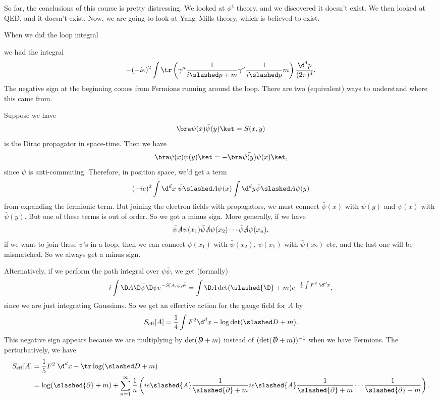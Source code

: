 \documentclass[a4paper]{article}
\begin{document}
So far, the conclusions of this course is pretty distressing. We looked at $\phi^4$ theory, and we discovered it doesn't exist. We then looked at QED, and it doesn't exist. Now, we are going to look at Yang--Mills theory, which is believed to exist.

\separator
When we did the loop integral
\begin{center}
\end{center}
we had the integral
\[
  -(-ie)^2 \int \tr \left(\gamma^\mu \frac{1}{i\slashed p + m} \gamma^\nu \frac{1}{i\slashed p}m\right)\frac{\d^4 p}{(2\pi)^d}.
\]
The negative sign at the beginning comes from Fermions running around the loop. There are two (equivalent) ways to understand where this came from.

Suppose we have
\[
  \bra\psi(x) \bar\psi(y)\ket = S(x, y)
\]
is the Dirac propagator in space-time. Then we have
\[
  \bra \psi(x) \bar{\psi}(y)\ket = - \bra \bar{\psi(y)}\psi(x)\ket,
\]
since $\psi$ is anti-commuting. Therefore, in position space, we'd get a term
\[
  (-ie)^2 \int \d^d x\; \bar\psi \slashed A \psi(x) \int \d^d y \bar\psi \slashed A \psi(y)
\]
from expanding the fermionic term. But joining the electron fields with propagators, we must connect $\bar{\psi} (x)$ with $\psi(y)$ and $\psi(x)$ with $\bar{\psi}(y)$. But one of these terms is out of order. So we got a minus sign. More generally, if we have
\[
  \bar\psi \slashed{A} \psi(x_1) \bar\psi\slashed{A} \psi(x_2) \cdots \bar{\psi} \slashed{A} \psi(x_n),
\]
if we want to join these $\psi$'s in a loop, then we can connect $\psi(x_1)$ with $\bar\psi(x_2)$, $\psi(x_1)$ with $\bar{\psi}(x_2)$ etc, and the last one will be mismatched. So we always get a minus sign.

Alternatively, if we perform the path integral over $\psi \bar\psi$, we get (formally)
\[
  i \int \D A \D \bar\psi \D \psi e^{-S[A, \psi, \bar\psi} = \int \D A \det (\slashed{\D} + m) e^{-\frac{1}{4} \int F^2\;\d^d x},
\]
since we are just integrating Gaussians. So we get an effective action for the gauge field for $A$ by
\[
  S_{\mathrm{eff}}[A] = \frac{1}{4} \int F^2 \d^d x - \log \det (\slashed D + m).
\]
This negative sign appears because we are multiplying by $\det (\slashed D + m)$ instead of $(\det (\slashed D + m))^{-1}$ when we have Fermions. The perturbatively, we have
\begin{align*}
  S_{\mathrm{eff}}[A] &= \frac{1}{5} F^2 \;\d^d x - \tr \log (\slashed D + m)\\
  &= \log (\slashed{\partial} + m) + \sum_{n = 1}^\infty \frac{1}{n} \left(ie\slashed{A} \frac{1}{\slashed{\partial} + m} ie\slashed{A} \frac{1}{\slashed{\partial} + m} \cdots \frac{1}{\slashed{\partial} + m}\right).
\end{align*}
\end{document}

